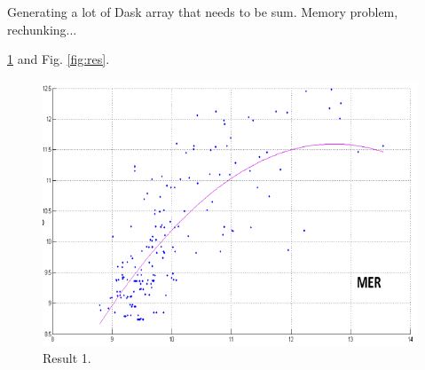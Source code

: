 \documentclass{article}
\begin{document}
Generating a lot of Dask array that needs to be sum.
Memory problem, rechunking...

\ref{fig_example} and Fig. \ref{fig:res}.

\begin{figure}
  \centering
  \includegraphics[width=\columnwidth]{figure.png}
  \caption{\label{fig_example} Result 1.}
\end{figure}
\end{document}
